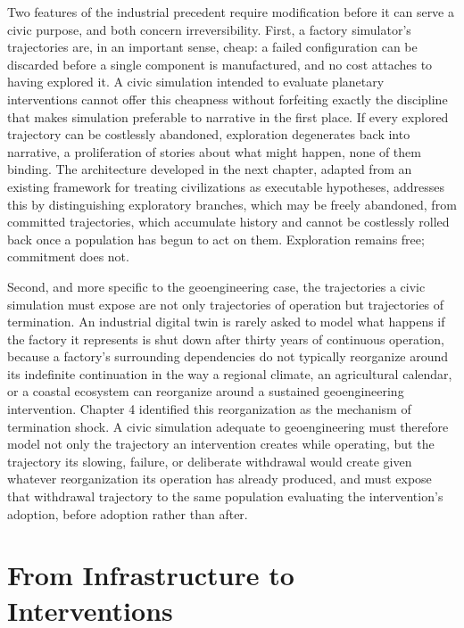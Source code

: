\documentclass[11pt,oneside]{book}
\begin{document}
Two features of the industrial precedent require modification before it can serve a civic purpose, and both concern irreversibility. First, a factory simulator's trajectories are, in an important sense, cheap: a failed configuration can be discarded before a single component is manufactured, and no cost attaches to having explored it. A civic simulation intended to evaluate planetary interventions cannot offer this cheapness without forfeiting exactly the discipline that makes simulation preferable to narrative in the first place. If every explored trajectory can be costlessly abandoned, exploration degenerates back into narrative, a proliferation of stories about what might happen, none of them binding. The architecture developed in the next chapter, adapted from an existing framework for treating civilizations as executable hypotheses, addresses this by distinguishing exploratory branches, which may be freely abandoned, from committed trajectories, which accumulate history and cannot be costlessly rolled back once a population has begun to act on them. Exploration remains free; commitment does not.

Second, and more specific to the geoengineering case, the trajectories a civic simulation must expose are not only trajectories of operation but trajectories of termination. An industrial digital twin is rarely asked to model what happens if the factory it represents is shut down after thirty years of continuous operation, because a factory's surrounding dependencies do not typically reorganize around its indefinite continuation in the way a regional climate, an agricultural calendar, or a coastal ecosystem can reorganize around a sustained geoengineering intervention. Chapter 4 identified this reorganization as the mechanism of termination shock. A civic simulation adequate to geoengineering must therefore model not only the trajectory an intervention creates while operating, but the trajectory its slowing, failure, or deliberate withdrawal would create given whatever reorganization its operation has already produced, and must expose that withdrawal trajectory to the same population evaluating the intervention's adoption, before adoption rather than after.

\section*{From Infrastructure to Interventions}
\end{document}
